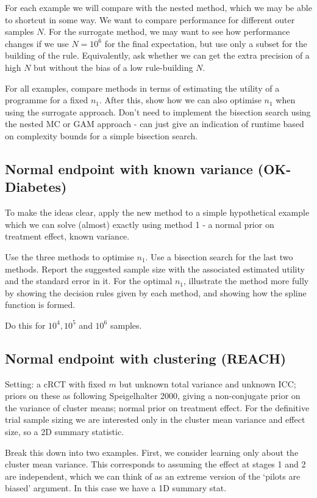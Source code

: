 \documentclass[sagev, Crown]{sagej} %
\begin{document}
For each example we will compare with the nested method, which we may be able to shortcut in some way. We want to compare performance for different outer samples $N$. For the surrogate method, we may want to see how performance changes if we use $N=10^6$ for the final expectation, but use only a subset for the building of the rule. Equivalently, ask whether we can get the extra precision of a high $N$ but without the bias of a low rule-building $N$.

For all examples, compare methods in terms of estimating the utility of a programme for a fixed $n_1$. After this, show how we can also optimise $n_1$ when using the surrogate approach. Don't need to implement the bisection search using the nested MC or GAM approach - can just give an indication of runtime based on complexity bounds for a simple bisection search.

\subsection{Normal endpoint with known variance (OK-Diabetes)}

To make the ideas clear, apply the new method to a simple hypothetical example which we can solve (almost) exactly using method 1 - a normal prior on treatment effect, known variance. 

Use the three methods to optimise $n_1$. Use a bisection search for the last two methods. Report the suggested sample size with the associated estimated utility and the standard error in it. For the optimal $n_1$, illustrate the method more fully by showing the decision rules given by each method, and showing how the spline function is formed. 

Do this for $10^4, 10^5$ and $10^6$ samples.

\subsection{Normal endpoint with clustering (REACH)}

Setting: a cRCT with fixed $m$ but unknown total variance and unknown ICC; priors on these as following Speigelhalter 2000, giving a non-conjugate prior on the variance of cluster means; normal prior on treatment effect. For the definitive trial sample sizing we are interested only in the cluster mean variance and effect size, so a 2D summary statistic.

Break this down into two examples. First, we consider learning only about the cluster mean variance. This corresponds to assuming the effect at stages 1 and 2 are independent, which we can think of as an extreme version of the `pilots are biased' argument. In this case we have a 1D summary stat.
\end{document}
